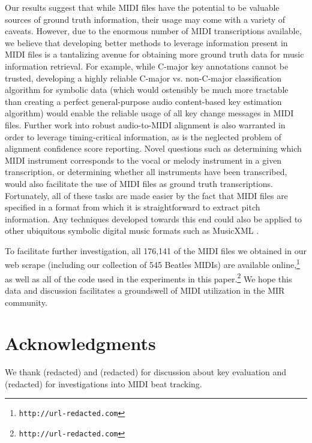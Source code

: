 \documentclass{article}
\begin{document}
Our results suggest that while MIDI files have the potential to be valuable sources of ground truth information, their usage may come with a variety of caveats.
However, due to the enormous number of MIDI transcriptions available, we believe that developing better methods to leverage information present in MIDI files is a tantalizing avenue for obtaining more ground truth data for music information retrieval.
For example, while C-major key annotations cannot be trusted, developing a highly reliable C-major vs. non-C-major classification algorithm for symbolic data (which would ostensibly be much more tractable than creating a perfect general-purpose audio content-based key estimation algorithm) would enable the reliable usage of all key change messages in MIDI files.
Further work into robust audio-to-MIDI alignment is also warranted in order to leverage timing-critical information, as is the neglected problem of alignment confidence score reporting.
Novel questions such as determining which MIDI instrument corresponds to the vocal or melody instrument in a given transcription, or determining whether all instruments have been transcribed, would also facilitate the use of MIDI files as ground truth transcriptions.
Fortunately, all of these tasks are made easier by the fact that MIDI files are specified in a format from which it is straightforward to extract pitch information.
Any techniques developed towards this end could also be applied to other ubiquitous symbolic digital music formats such as MusicXML \cite{good2001musicxml}.

To facilitate further investigation, all 176,141 of the MIDI files we obtained in our web scrape (including our collection of 545 Beatles MIDIs) are available online,\footnote{\texttt{http://url-redacted.com}} as well as all of the code used in the experiments in this paper.\footnote{\texttt{http://url-redacted.com}}
We hope this data and discussion facilitates a groundswell of MIDI utilization in the MIR community.

\section{Acknowledgments}

We thank (redacted) %
and (redacted) %
for discussion about key evaluation and (redacted) %
for investigations into MIDI beat tracking.

\small

\end{document}
